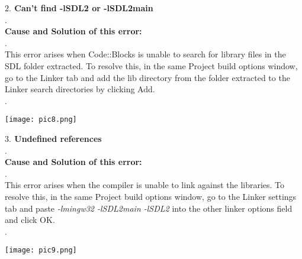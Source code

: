 \documentclass{article}
\begin{document}
\begin{flushleft}
		
		\textbf{$ 2. $ Can't find -lSDL2 or -lSDL2main} \\
		.\\
		
		\textbf{Cause and Solution of this error:}\\.\\
		This error arises when Code::Blocks is unable to search for library files in the SDL folder extracted. To resolve this, in the same Project build options window, go to the Linker tab and add the lib directory from the folder extracted to the Linker search directories by clicking Add.\\.\\
		\begin{center}
			\texttt{[image: pic8.png]}
		\end{center}
		
		\textbf{$ 3. $ Undefined references} \\.\\
		\textbf{Cause and Solution of this error:}\\.\\
		
		This error arises when the compiler is unable to link against the libraries. To resolve this, in the same Project build options window, go to the Linker settings tab and paste \textit{-lmingw32 -lSDL2main -lSDL2} into the other linker options field and click OK.\\.\\
		\begin{center}
			\texttt{[image: pic9.png]}
		\end{center}
		

\end{flushleft}
\end{document}
